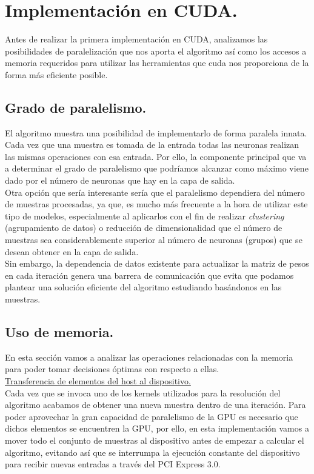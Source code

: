 \section{Implementación en CUDA.}
Antes de realizar la primera implementación en CUDA, analizamos las posibilidades de paralelización que nos aporta el algoritmo así como los accesos a memoria requeridos para utilizar las herramientas que cuda nos proporciona de la forma más eficiente posible.

\subsection{Grado de paralelismo.}
El algoritmo muestra una posibilidad de implementarlo de forma paralela innata. Cada vez que una muestra es tomada de la entrada todas las neuronas realizan las mismas operaciones con esa entrada. Por ello, la componente principal que va a determinar el grado de paralelismo que podríamos alcanzar como máximo viene dado por el número de neuronas que hay en la capa de salida. \\

Otra opción que sería interesante sería que el paralelismo dependiera del número de muestras procesadas, ya que, es mucho más frecuente a la hora de utilizar este tipo de modelos, especialmente al aplicarlos con el fin de realizar \textit{clustering} (agrupamiento de datos) o reducción de dimensionalidad que el número de muestras sea considerablemente superior al número de neuronas (grupos) que se desean obtener en la capa de salida. \\

Sin embargo, la dependencia de datos existente para actualizar la matriz de pesos en cada iteración genera una barrera de comunicación que evita que podamos plantear una solución eficiente del algoritmo estudiando basándonos en las muestras.

\subsection{Uso de memoria.}
En esta sección vamos a analizar las operaciones relacionadas con la memoria para poder tomar decisiones óptimas con respecto a ellas. \\

\underline{Transferencia de elementos del host al dispositivo.}\\
Cada vez que se invoca uno de los kernels utilizados para la resolución del algoritmo acabamos de obtener una nueva muestra dentro de una iteración. Para poder aprovechar la gran capacidad de paralelismo de la GPU es necesario que dichos elementos se encuentren la GPU, por ello, en esta implementación vamos a mover todo el conjunto de muestras al dispositivo antes de empezar a calcular el algoritmo, evitando así que se interrumpa la ejecución constante del dispositivo para recibir nuevas entradas a través del PCI Express 3.0.

